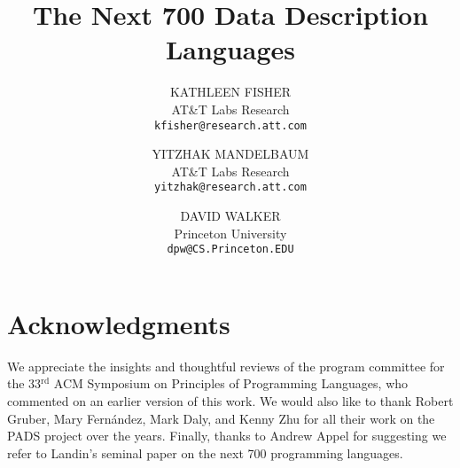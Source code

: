 \documentclass[acmjacm]{acmtrans2m}
\title{The Next 700 Data Description Languages}
\author{ 
KATHLEEN FISHER \\ AT\&T Labs Research \\ \texttt{kfisher@research.att.com}
\and 
YITZHAK MANDELBAUM \\ AT\&T Labs Research \\ \texttt{yitzhak@research.att.com}
\and 
DAVID WALKER \\ Princeton University \\  \texttt{dpw@CS.Princeton.EDU}
}
\begin{document}


\maketitle{}

\begin{abstract}

\end{abstract}

\category{}{}{}




















\section*{Acknowledgments}

We appreciate the insights and thoughtful reviews of the program committee for the 33$^{\mathrm{rd}}$ ACM Symposium on Principles of Programming Languages, who commented on an earlier version of this work.  We would also like to thank Robert Gruber, Mary Fern\'{a}ndez, Mark Daly, and Kenny Zhu for all their work on the PADS project over the years. Finally, thanks to Andrew Appel for suggesting we refer to Landin's seminal paper on the next 700 programming languages. 

 


\end{document}
